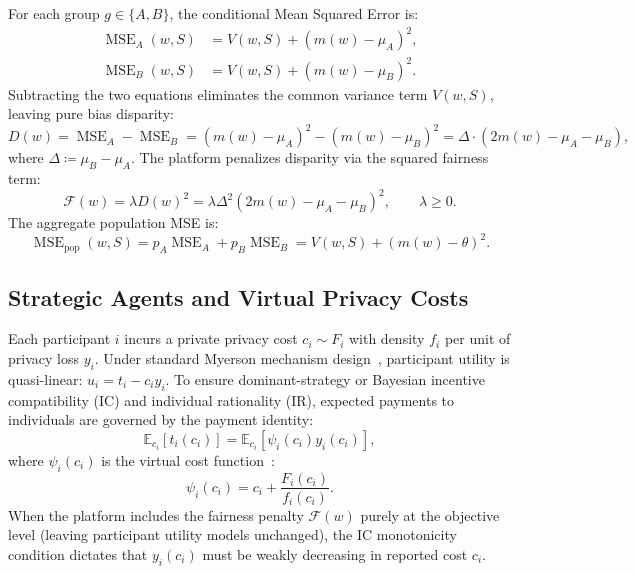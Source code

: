 \documentclass[11pt,a4paper]{article}
\newcommand{\E}{\mathbb{E}}
\newcommand{\MSE}{\operatorname{MSE}}
\begin{document}
For each group $g \in \{A, B\}$, the conditional Mean Squared Error is:
\begin{align}
    \MSE_A(w, S) &= V(w, S) + (m(w) - \mu_A)^2, \\
    \MSE_B(w, S) &= V(w, S) + (m(w) - \mu_B)^2.
\end{align}
Subtracting the two equations eliminates the common variance term $V(w,S)$, leaving pure bias disparity:
\begin{equation}
    D(w) = \MSE_A - \MSE_B = (m(w) - \mu_A)^2 - (m(w) - \mu_B)^2 = \Delta \cdot (2m(w) - \mu_A - \mu_B),
\end{equation}
where $\Delta \coloneqq \mu_B - \mu_A$. The platform penalizes disparity via the squared fairness term:
\begin{equation}
    \mathcal{F}(w) = \lambda D(w)^2 = \lambda \Delta^2 \left(2m(w) - \mu_A - \mu_B\right)^2, \qquad \lambda \geq 0.
\end{equation}
The aggregate population MSE is:
\begin{equation}
    \MSE_{\mathrm{pop}}(w, S) = p_A \MSE_A + p_B \MSE_B = V(w, S) + (m(w) - \theta)^2.
\end{equation}

\subsection{Strategic Agents and Virtual Privacy Costs}

Each participant $i$ incurs a private privacy cost $c_i \sim F_i$ with density $f_i$ per unit of privacy loss $y_i$. Under standard Myerson mechanism design~\cite{myerson1981optimal}, participant utility is quasi-linear: $u_i = t_i - c_i y_i$. To ensure dominant-strategy or Bayesian incentive compatibility (IC) and individual rationality (IR), expected payments to individuals are governed by the payment identity:
\begin{equation}
    \E_{c_i}[t_i(c_i)] = \E_{c_i}[\psi_i(c_i) y_i(c_i)],
\end{equation}
where $\psi_i(c_i)$ is the virtual cost function~\cite{myerson1981optimal}:
\begin{equation}
    \psi_i(c_i) = c_i + \frac{F_i(c_i)}{f_i(c_i)}.
\end{equation}
When the platform includes the fairness penalty $\mathcal{F}(w)$ purely at the objective level (leaving participant utility models unchanged), the IC monotonicity condition dictates that $y_i(c_i)$ must be weakly decreasing in reported cost $c_i$.
\end{document}
